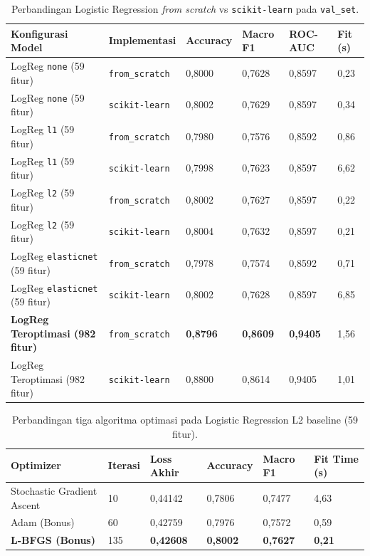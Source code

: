 \documentclass[11pt,a4paper]{article}
\numberwithin{figure}{section}
\numberwithin{table}{section}
\begin{document}
\begin{table}[H]
  \centering
  \small
  \setlength{\tabcolsep}{4pt}
  \caption{Perbandingan Logistic Regression \textit{from scratch} vs \texttt{scikit-learn} pada \texttt{val\_set}.}
  \label{tab:lr}
  \begin{tabularx}{\textwidth}{|Y|L{2.55cm}|R{1.65cm}|R{1.65cm}|R{1.65cm}|R{1.3cm}|}
    \hline
    \textbf{Konfigurasi Model} & \textbf{Implementasi} & \textbf{Accuracy} & \textbf{Macro F1} & \textbf{ROC-AUC} & \textbf{Fit (s)} \\
    \hline
    LogReg \texttt{none} (59 fitur) & \texttt{from\_scratch} & 0,8000 & 0,7628 & 0,8597 & 0,23 \\
    \hline
    LogReg \texttt{none} (59 fitur) & \texttt{scikit-learn} & 0,8002 & 0,7629 & 0,8597 & 0,34 \\
    \hline
    LogReg \texttt{l1} (59 fitur) & \texttt{from\_scratch} & 0,7980 & 0,7576 & 0,8592 & 0,86 \\
    \hline
    LogReg \texttt{l1} (59 fitur) & \texttt{scikit-learn} & 0,7998 & 0,7623 & 0,8597 & 6,62 \\
    \hline
    LogReg \texttt{l2} (59 fitur) & \texttt{from\_scratch} & 0,8002 & 0,7627 & 0,8597 & 0,22 \\
    \hline
    LogReg \texttt{l2} (59 fitur) & \texttt{scikit-learn} & 0,8004 & 0,7632 & 0,8597 & 0,21 \\
    \hline
    LogReg \texttt{elasticnet} (59 fitur) & \texttt{from\_scratch} & 0,7978 & 0,7574 & 0,8592 & 0,71 \\
    \hline
    LogReg \texttt{elasticnet} (59 fitur) & \texttt{scikit-learn} & 0,8002 & 0,7628 & 0,8597 & 6,85 \\
    \hline
    \textbf{LogReg Teroptimasi (982 fitur)} & \texttt{from\_scratch} & \textbf{0,8796} & \textbf{0,8609} & \textbf{0,9405} & 1,56 \\
    \hline
    LogReg Teroptimasi (982 fitur) & \texttt{scikit-learn} & 0,8800 & 0,8614 & 0,9405 & 1,01 \\
    \hline
  \end{tabularx}
\end{table}

\begin{table}[H]
  \centering
  \small
  \setlength{\tabcolsep}{4pt}
  \caption{Perbandingan tiga algoritma optimasi pada Logistic Regression L2 baseline (59 fitur).}
  \label{tab:lr_opt}
  \begin{tabularx}{\textwidth}{|Y|R{1.4cm}|R{2.0cm}|R{1.7cm}|R{1.7cm}|R{1.9cm}|}
    \hline
    \textbf{Optimizer} & \textbf{Iterasi} & \textbf{Loss Akhir} & \textbf{Accuracy} & \textbf{Macro F1} & \textbf{Fit Time (s)} \\
    \hline
    Stochastic Gradient Ascent & 10 & 0,44142 & 0,7806 & 0,7477 & 4,63 \\
    \hline
    Adam (Bonus) & 60 & 0,42759 & 0,7976 & 0,7572 & 0,59 \\
    \hline
    \textbf{L-BFGS (Bonus)} & 135 & \textbf{0,42608} & \textbf{0,8002} & \textbf{0,7627} & \textbf{0,21} \\
    \hline
  \end{tabularx}
\end{table}
\end{document}
